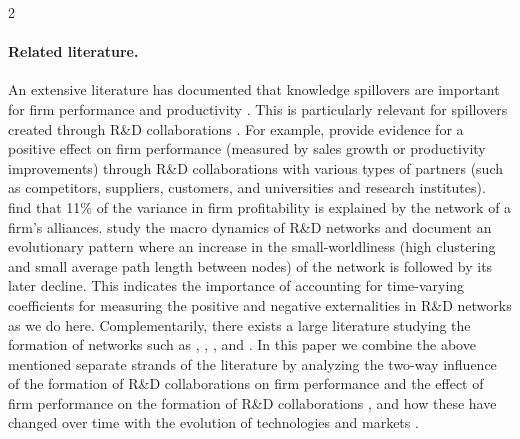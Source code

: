\documentclass[12pt]{article}
\begin{document}
\begin{spacing}{2}
\paragraph{Related literature.} An extensive literature has documented that knowledge spillovers are important for firm performance and productivity \citep[][]{audretsch2020role, ugur2020we}. This is particularly relevant for  spillovers created through R\&D collaborations \citep[][]{ahuja00:_collab, powell1999network, allenphillips2000, Baum2010, rosenkopf08:_inves_micros_of_networ_evolut}. 
For example, \citet[][]{belderbos2004cooperative} provide evidence for a positive effect on firm performance (measured by sales growth or productivity improvements) through R\&D collaborations with various types of partners (such as competitors, suppliers, customers, and universities and research institutes). 
\citet{kumar2022much} find that 11\% of the variance in firm profitability is explained by the network of a firm's alliances. 
\citet{Gulati2010} study the macro dynamics of R\&D networks and document an evolutionary pattern where an increase in the small-worldliness (high clustering and small average path length between nodes) of the network is followed by its later decline. This indicates the importance of accounting for time-varying coefficients for measuring the positive and negative externalities in R\&D networks as we do here. Complementarily, there exists a large literature studying the formation of networks such as \citet[][]{powell05:_networ_dynam_field_evolut}, \citet[][]{liben2003link}, \citet{goyal03:_networ_collab_oligop, goyal01:_r_d_networ}, \citet[][]{Fafchamps2010} and \citet{petrakis2018effect}. In this paper we combine the above mentioned separate strands of the literature by analyzing the two-way influence of the formation of R\&D collaborations on firm performance and the effect of firm performance on the formation of R\&D collaborations \citep[cf.][]{koza1998co}, and how these have changed over time with the evolution of technologies and markets \citep[cf.][]{Lucking2019}. 


\end{spacing}
\end{document}
